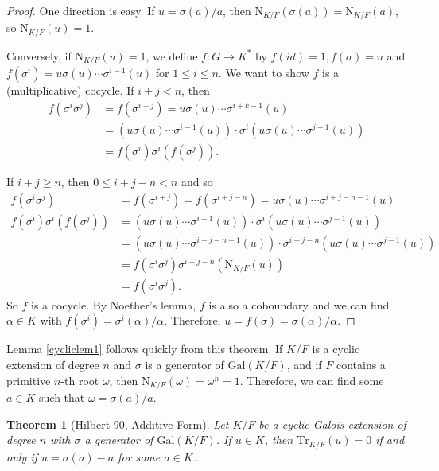 \documentclass[12pt]{report}
\newtheorem{theorem}{Theorem}[section]
\theoremstyle{definition}
\newcommand{\Gal}{\text{Gal}}
\newcommand{\Tr}{\text{Tr}}
\newcommand{\nm}{\text{N}}
\begin{document}
\begin{proof}
	One direction is easy. If $u=\sigma(a)/a$, then $\nm_{K/F}(\sigma(a))=\nm_{K/F}(a)$, so $\nm_{K/F}(u)=1$.

	Conversely, if $\nm_{K/F}(u)=1$, we define $f: G\to K^*$ by $f(id)=1,f(\sigma)=u$ and $f(\sigma^i)=u\sigma(u)\cdots\sigma^{i-1}(u)$ for $1\leq i\leq n$. We want to show $f$ is a (multiplicative) cocycle. If $i+j< n$, then \begin{align*}
		f(\sigma^i\sigma^j) & = f(\sigma^{i+j})=u\sigma(u)\cdots\sigma^{i+k-1}(u)                                \\
		                    & = (u\sigma(u)\cdots\sigma^{i-1}(u))\cdot \sigma^i(u\sigma(u)\cdots\sigma^{j-1}(u)) \\
		                    & =f(\sigma^i)\sigma^i(f(\sigma^j)).
	\end{align*}

	If $i+j\geq n$, then $0\leq i+j-n<n$ and so \begin{align*}
		f(\sigma^i\sigma^j)              & = f(\sigma^{i+j})=f(\sigma^{i+j-n})=u\sigma(u)\cdots\sigma^{i+j-n-1}(u)                     \\
		f(\sigma^i)\sigma^i(f(\sigma^j)) & =(u\sigma(u)\cdots\sigma^{i-1}(u))\cdot \sigma^i(u\sigma(u)\cdots\sigma^{j-1}(u))           \\
		                                 & =(u\sigma(u)\cdots\sigma^{i+j-n-1}(u))\cdot \sigma^{i+j-n}(u\sigma(u)\cdots\sigma^{j-1}(u)) \\
		                                 & =  f(\sigma^i\sigma^j)\sigma^{i+j-n}(\nm_{K/F}(u))                                          \\
		                                 & =  f(\sigma^i\sigma^j).
	\end{align*}
	So $f$ is a cocycle. By Noether's lemma, $f$ is also a coboundary and we can find $\alpha\in K$ with $f(\sigma^i)=\sigma^i(\alpha)/\alpha$. Therefore, $u=f(\sigma)=\sigma(\alpha)/\alpha$.
\end{proof}


Lemma \ref{cycliclem1} follows quickly from this theorem. If $K/F$ is a cyclic extension of degree $n$ and $\sigma$ is a generator of $\Gal(K/F)$, and if $F$ contains a primitive $n$-th root $\omega$, then $\nm_{K/F}(\omega)=\omega^n=1$. Therefore, we can find some $a\in K$ such that $\omega=\sigma(a)/a$.

\begin{theorem}[Hilbert 90, Additive Form]
	Let $K/F$ be a cyclic Galois extension of degree $n$ with $\sigma$ a generator of $\Gal(K/F)$. If $u\in K$, then $\Tr_{K/F}(u)=0$ if and only if $u=\sigma(a)-a$ for some $a\in K$.
\end{theorem}
\end{document}
